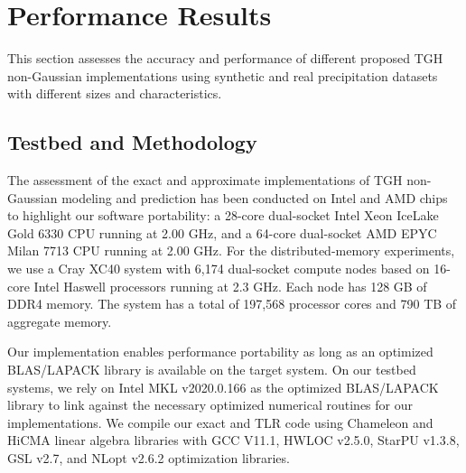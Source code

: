 \documentclass[conference]{IEEEtran}
\begin{document}
\section{Performance Results}
This section assesses the accuracy and performance of 
different proposed TGH non-Gaussian implementations
using synthetic and real precipitation datasets with different sizes and
characteristics. 





\subsection{Testbed and Methodology}
The assessment of the exact and approximate implementations of TGH non-Gaussian modeling and prediction has been conducted  on
Intel and AMD chips to highlight our software
portability: a 28-core dual-socket Intel Xeon IceLake
Gold 6330 CPU running at 2.00 GHz, and a 64-core dual-socket AMD EPYC Milan 7713 CPU running at 2.00 GHz. For the distributed-memory experiments, we use a Cray XC40
system with 6,174 dual-socket compute nodes based on 16-
core Intel Haswell processors running at 2.3 GHz. Each node
has 128 GB of DDR4 memory. The system has a total of
197,568 processor cores and 790 TB of aggregate memory.

Our implementation enables performance portability as long as an optimized BLAS/LAPACK library is available on the target system. On our testbed systems, we rely on Intel MKL v2020.0.166 as the optimized BLAS/LAPACK library to link against the necessary optimized numerical routines for our implementations. We compile our exact and TLR code using Chameleon and HiCMA linear algebra libraries with  GCC V11.1, HWLOC v2.5.0, StarPU v1.3.8,  GSL v2.7,
and NLopt v2.6.2 optimization libraries. 
\end{document}
